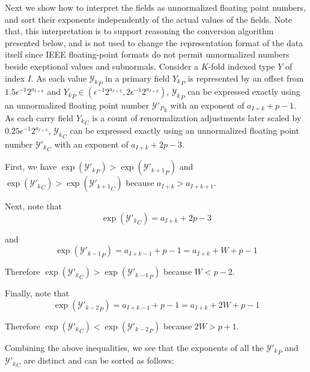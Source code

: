     Next we show how to interpret the fields as unnormalized floating point numbers,
    and sort their exponents independently of the actual values of the fields.
    Note that, this interpretation is to support reasoning the conversion algorithm
    presented below, and is not used to change the representation format of the data itself
    since IEEE floating-point formats do not permit unnormalized numbers
    beside exeptional values and subnormals.
    Consider a $K$-fold indexed type $Y$ of index $I$.
    As each value ${\mathcal{Y}_k}_P$ in a primary field ${Y_k}_P$ is represented by an offset from $1.5  \epsilon^{-1}  2^{a_{I + k}}$ and ${Y_k}_P \in (\epsilon^{-1}  2^{a_{I + k}}, 2  \epsilon^{-1}  2^{a_{I + k}})$, ${\mathcal{Y}_k}_P$ can be expressed exactly using an unnormalized floating point number ${\mathcal{Y}'_P}_k$ with an exponent of $a_{I + k} + p - 1$.
    As each carry field ${Y_k}_C$ is a count of renormalization adjustments later scaled by $0.25  \epsilon^{-1}  2^{a_{I + k}}$, ${\mathcal{Y}_k}_C$ can be expressed exactly using an unnormalized floating point number ${\mathcal{Y}'_k}_C$ with an exponent of $a_{I + k} + 2  p - 3$.

    First, we have $\exp({\mathcal{Y}'_k}_P) > \exp({\mathcal{Y}'_{k+1}}_P)$ and $\exp({\mathcal{Y}'_{k}}_C) > \exp({\mathcal{Y}'_{k+1}}_C)$ because $a_{I + k} > a_{I + k+1}$.

    Next, note that
    \begin{equation*}
      \exp({\mathcal{Y}'_k}_C) = a_{I + k} + 2  p - 3
    \end{equation*}

    and
    \begin{equation*}
      \exp({\mathcal{Y}'_{k - 1}}_P) = a_{I + k - 1} + p - 1 = a_{I + k} + W + p - 1
    \end{equation*}

    Therefore $\exp({\mathcal{Y}'_k}_C) > \exp({\mathcal{Y}'_{k - 1}}_P)$ because $W < p - 2$.

    Finally, note that
    \begin{equation*}
      \exp({\mathcal{Y}'_{k - 2}}_P) = a_{I + k - 1} + p - 1 = a_{I + k} + 2 W + p - 1
    \end{equation*}

    Therefore $\exp({\mathcal{Y}'_k}_C) < \exp({\mathcal{Y}'_{k - 2}}_P)$ because $2  W > p + 1$.

    Combining the above inequalities, we see that the exponents of all the ${\mathcal{Y}'_k}_P$ and ${\mathcal{Y}'_k}_C$ are distinct and can be sorted as follows:


